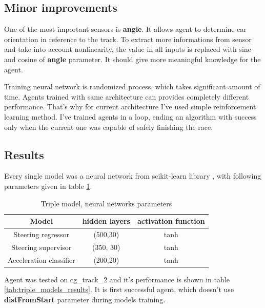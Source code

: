 \documentclass[declaration,shortabstract,english,inz]{iithesis}
\begin{document}
\subsection{Minor improvements}
One of the most important sensors is \textbf{angle}. It allows agent to determine car orientation in reference to the track. To extract more informations from sensor and take into account nonlinearity, the value in all inputs is replaced with sine and cosine of \textbf{angle} parameter. It should give more meaningful knowledge for the agent. 


Training neural network is randomized process, which takes significant amount of time. Agents trained with same architecture can provides completely different performance. 
That's why for current architecture I've used simple reinforcement learning method. I've trained agents in a loop, ending an algorithm with success only when the current one was capable of safely finishing the race. 


\subsection{Results}



Every single model was a neural network from scikit-learn library \cite{scikit_learn}, with following parameters given in table \ref{tab:triple_models_nn_params}.

\begin{table}[h]
    \centering
    \begin{tabular}{ |c|c|c|}
          \hline
          Model & hidden layers & activation function \\
          \hline
          Steering regressor & (500,30) &  tanh  \\
          \hline
          Steering supervisor &  (350, 30) & tanh \\
          \hline
          Acceleration classifier & (200,20) & tanh \\
          \hline
        \end{tabular}
        \caption{Triple model, neural networks parameters}
        \label{tab:triple_models_nn_params}
\end{table}

Agent was tested on cg\_track\_2 and it's performance is shown in table \ref{tab:triple_models_results}. It is first successful agent, which doesn't use \textbf{distFromStart} parameter during models training. 
\end{document}
